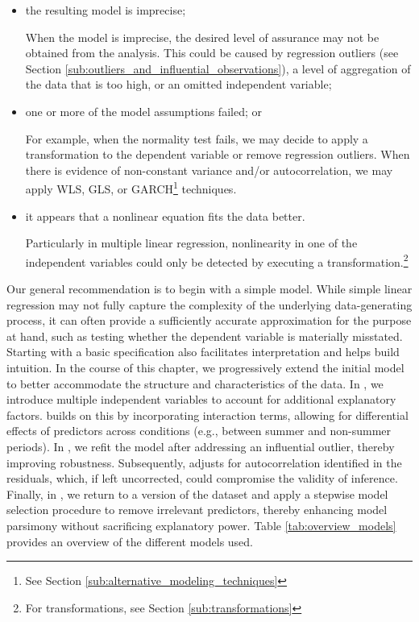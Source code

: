 \begin{itemize}
  \item the resulting model is imprecise;

  When the model is imprecise, the desired level of assurance may not be obtained from the analysis. This could be caused by regression outliers (see Section \ref{sub:outliers_and_influential_observations}), a level of aggregation of the data that is too high, or an omitted independent variable;

  \item one or more of the model assumptions failed; or

  For example, when the normality test fails, we may decide to apply a transformation to the dependent variable or remove regression outliers. When there is evidence of non-constant variance and/or autocorrelation, we may apply WLS, GLS, or GARCH\footnote{See Section \ref{sub:alternative_modeling_techniques}} techniques.

  \item it appears that a nonlinear equation fits the data better.

  Particularly in multiple linear regression, nonlinearity in one of the independent variables could only be detected by executing a transformation.\footnote{For transformations, see Section \ref{sub:transformations}}
\end{itemize}

\bigskip
Our general recommendation is to begin with a simple model. 
While simple linear regression may not fully capture the complexity of the underlying data-generating process, it can often provide a sufficiently accurate approximation for the purpose at hand, such as testing whether the dependent variable is materially misstated. 
Starting with a basic specification also facilitates interpretation and helps build intuition. 
In the course of this chapter, we progressively extend the initial model to better accommodate the structure and characteristics of the data. 
In , we introduce multiple independent variables to account for additional explanatory factors.  builds on this by incorporating interaction terms, allowing for differential effects of predictors across conditions (e.g., between summer and non-summer periods). 
In , we refit the model after addressing an influential outlier, thereby improving robustness. Subsequently,  adjusts for autocorrelation identified in the residuals, which, if left uncorrected, could compromise the validity of inference. 
Finally, in , we return to a  version of the dataset and apply a stepwise model selection procedure to remove irrelevant predictors, thereby enhancing model parsimony without sacrificing explanatory power. 
Table \ref{tab:overview_models} provides an overview of the different models used.

